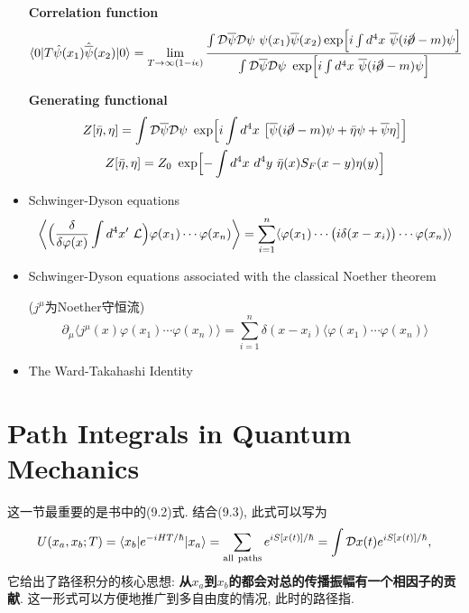 \begin{itemize}
        \textbf{Correlation function}
        \begin{equation*}
          \langle 0|T\hat{\psi}(x_1)\hat{\overline{\psi}}(x_2)|0 \rangle = \lim_{T\rightarrow \infty(1-i\epsilon)}\frac{\int \mathcal{D}\overline{\psi} \mathcal{D}\psi\ \psi(x_1)\overline{\psi}(x_2) \exp\Bigl[i\int d^4x\ \overline{\psi}(i\cancel{\partial}-m)\psi\Bigr]}{\int \mathcal{D}\overline{\psi} \mathcal{D}\psi\ \exp\Bigl[i\int d^4x\ \overline{\psi}(i\cancel{\partial}-m)\psi\Bigr]}
        \end{equation*}

        \textbf{Generating functional}
        \begin{gather*}
          Z[\bar{\eta}, \eta] = \int \mathcal{D}\overline{\psi} \mathcal{D}\psi\ \exp\Bigl[i\int d^4x\ \bigl[\overline{\psi}(i\cancel{\partial}-m)\psi + \bar{\eta}\psi + \overline{\psi}\eta\bigr]\Bigr] \\
          Z[\bar{\eta}, \eta] = Z_0\ \exp\Bigl[-\int d^4x\ d^4y\ \bar{\eta}(x)S_F(x-y)\eta(y)\Bigr]
        \end{gather*}
  \item Schwinger-Dyson equations
        \begin{equation*}
          \biggl\langle\Bigl(\frac{\delta}{\delta\varphi(x)}\int d^4x'\ \mathcal{L}\Bigr) \varphi(x_1)\cdots \varphi(x_n)\biggr\rangle = \sum_{i=1}^{n}\langle\varphi(x_1)\cdots \bigl(i\delta(x-x_i)\bigr)\cdots\varphi(x_n) \rangle
        \end{equation*}
  \item Schwinger-Dyson equations associated with the classical Noether theorem

        ($j^\mu$为Noether守恒流)
        \begin{equation*}
          \partial_\mu \langle j^\mu(x) \varphi(x_1)\cdots\varphi(x_n)\rangle = \sum_{i=1}^{n}\delta(x-x_i)\langle\varphi(x_1)\cdots\varphi(x_n)\rangle
        \end{equation*}
  \item The Ward-Takahashi Identity

\end{itemize}
\pagestyle{general}

\section{Path Integrals in Quantum Mechanics}

这一节最重要的是书中的(9.2)式. 结合(9.3), 此式可以写为
\begin{equation}\label{eq: path_nonfield}
  U(x_a,x_b;T)=\langle x_b|e^{-iHT/\hbar}|x_a \rangle = \sum_{\rm all\ paths} e^{iS[x(t)]/\hbar} = \int \mathcal{D}x(t)e^{iS[x(t)]/\hbar},
\end{equation}
它给出了路径积分的核心思想: \textbf{从$x_a$到$x_b$的都会对总的传播振幅有一个相因子的贡献}. 这一形式可以方便地推广到多自由度的情况, 此时的路径指.

